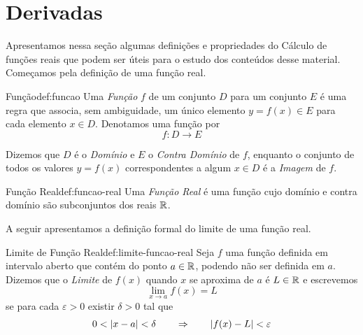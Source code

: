 \section{Derivadas}
\label{sec:Derivadas}

Apresentamos nessa seção algumas definições e propriedades do Cálculo de
funções reais que podem ser úteis para o estudo dos conteúdos desse material.
Começamos pela definição de uma função real.

\begin{definicao}{Função}{def:funcao}
  Uma \emph{Função} $f$ de um conjunto $D$ para um conjunto $E$
  é uma regra que associa, sem ambiguidade, um único elemento $y=f(x)\in E$
  para cada elemento $x\in D$. Denotamos uma função por
  \[
    f: D \to E
  \]
\end{definicao}

Dizemos que $D$ é o \emph{Domínio} e $E$ o
\emph{Contra Domínio} de $f$, enquanto o
conjunto de todos os valores $y=f(x)$ correspondentes a algum $x\in D$ é
a \emph{Imagem} de $f$.

\begin{definicao}{Função Real}{def:funcao-real}
  Uma \emph{Função Real} é uma função cujo domínio e
  contra domínio são subconjuntos dos reais $\mathbb{R}$.
\end{definicao}

A seguir apresentamos a definição formal do limite de uma função real.

\begin{definicao}{Limite de Função Real}{def:limite-funcao-real}
  Seja $f$ uma função definida em intervalo aberto que contém do ponto $a\in\mathbb{R}$,
  podendo não ser definida em $a$. Dizemos que o \emph{Limite}
  de $f(x)$ quando $x$ se aproxima de $a$ é $L\in\mathbb{R}$ e escrevemos
  \[
    \lim_{x\to a} f(x) = L
  \]
  se para cada $\varepsilon>0$ existir $\delta>0$ tal que
  \[
    0 < \abs{x-a} < \delta \qquad\Rightarrow\qquad \abs{f(x)-L} < \varepsilon
  \]
\end{definicao}

